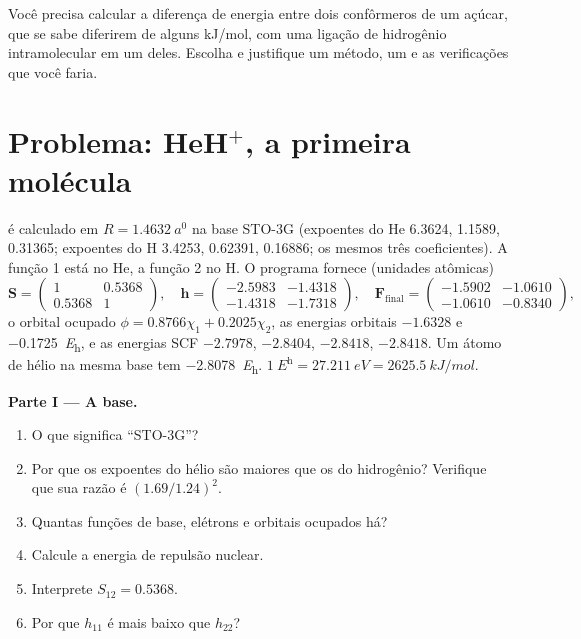 \begin{exercise}[$\star\star\star$]\label{exo:b3:computational-chemistry:12}
Você precisa calcular a diferença de energia entre dois confôrmeros de um
açúcar, que se sabe diferirem de alguns \unit{kJ/mol}, com uma ligação de
hidrogênio intramolecular em um deles. Escolha e justifique um método, um
 e as verificações que você faria.
\end{exercise}

\section{Problema: HeH\texorpdfstring{$^+$}{+}, a primeira molécula}

\begin{problem}
\label{pb:b3:computational-chemistry:1}
 é calculado em $R = \qty{1.4632}{\bohr}$ na base STO-3G (expoentes
do He 6.3624, 1.1589, 0.31365; expoentes do H 3.4253, 0.62391, 0.16886; os
mesmos três coeficientes). A função 1 está no He, a função 2 no H. O programa
fornece (unidades atômicas)
\[
\mathbf S = \begin{pmatrix}1 & 0.5368\\ 0.5368 & 1\end{pmatrix},\quad
\mathbf h = \begin{pmatrix}-2.5983 & -1.4318\\ -1.4318 & -1.7318\end{pmatrix},\quad
\mathbf F_{\mathrm{final}} = \begin{pmatrix}-1.5902 & -1.0610\\ -1.0610 & -0.8340
\end{pmatrix},
\]
o orbital ocupado $\phi = 0.8766\chi_1 + 0.2025\chi_2$, as energias orbitais
$-1.6328$ e \qty{-0.1725}{\hartree}, e as energias SCF $-2.7978$, $-2.8404$,
$-2.8418$, $-2.8418$. Um átomo de hélio na mesma base tem
\qty{-2.8078}{\hartree}. $\qty{1}{\hartree} = \qty{27.211}{eV} =
\qty{2625.5}{kJ/mol}$.

\medskip\noindent\textbf{Parte I --- A base.}
\begin{enumerate}
  \item O que significa ``STO-3G''?
  \item Por que os expoentes do hélio são maiores que os do hidrogênio? Verifique
        que sua razão é $(1.69/1.24)^2$.
  \item Quantas funções de base, elétrons e orbitais ocupados há?
  \item Calcule a energia de repulsão nuclear.
  \item Interprete $S_{12} = 0.5368$.
  \item Por que $h_{11}$ é mais baixo que $h_{22}$?
\end{enumerate}


\end{problem}

